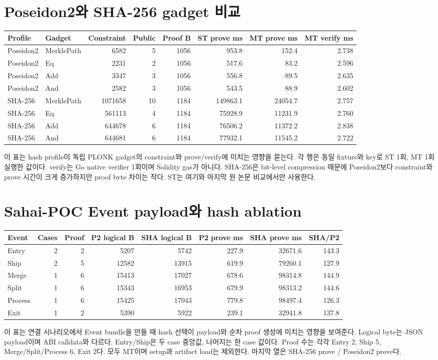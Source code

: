 \documentclass[10pt]{article}
\begin{document}
\section{Poseidon2와 SHA-256 gadget 비교}
\begin{longtable}{llrrrrrr}
\toprule Profile & Gadget & Constraint & Public & Proof B & ST prove ms & MT prove ms & MT verify ms\\
\midrule\endhead
Poseidon2 & MerklePath & 6582 & 5 & 1056 & 953.8 & 152.4 & 2.738\\
Poseidon2 & Eq & 2231 & 2 & 1056 & 517.6 & 83.2 & 2.596\\
Poseidon2 & Add & 3347 & 3 & 1056 & 556.8 & 89.5 & 2.635\\
Poseidon2 & And & 2582 & 3 & 1056 & 543.5 & 88.9 & 2.602\\
SHA-256 & MerklePath & 1071658 & 10 & 1184 & 149863.1 & 24054.7 & 2.757\\
SHA-256 & Eq & 561113 & 4 & 1184 & 75928.9 & 11231.9 & 2.760\\
SHA-256 & Add & 644678 & 6 & 1184 & 76506.2 & 11372.2 & 2.838\\
SHA-256 & And & 644681 & 6 & 1184 & 77932.1 & 11545.2 & 2.722\\
\bottomrule\end{longtable}
이 표는 hash profile이 독립 PLONK gadget의 constraint와 prove/verify에 미치는 영향을 묻는다. 각 행은 동일 fixture와 key로 ST 1회, MT 1회 실행한 값이다. verify는 Go native verifier 1회이며 Solidity gas가 아니다. SHA-256은 bit-level compression 때문에 Poseidon2보다 constraint와 prove 시간이 크게 증가하지만 proof byte 차이는 작다. ST는 여기와 마지막 원 논문 비교에서만 사용한다.
\section{Sahai-POC Event payload와 hash ablation}
\begin{longtable}{lrrrrrrr}
\toprule Event & Cases & Proof & P2 logical B & SHA logical B & P2 prove ms & SHA prove ms & SHA/P2\\
\midrule\endhead
Entry & 2 & 2 & 5207 & 5742 & 227.9 & 32671.6 & 143.3\\
Ship & 2 & 5 & 12582 & 13915 & 619.9 & 79260.1 & 127.9\\
Merge & 1 & 6 & 15413 & 17027 & 678.6 & 98314.8 & 144.9\\
Split & 1 & 6 & 15343 & 16953 & 679.9 & 98313.2 & 144.6\\
Process & 1 & 6 & 15425 & 17043 & 779.8 & 98497.4 & 126.3\\
Exit & 1 & 2 & 5390 & 5922 & 239.1 & 32941.8 & 137.8\\
\bottomrule\end{longtable}
이 표는 연결 시나리오에서 Event bundle을 만들 때 hash 선택이 payload와 순차 proof 생성에 미치는 영향을 보여준다. Logical byte는 JSON payload이며 ABI calldata와 다르다. Entry/Ship은 두 case 중앙값, 나머지는 한 case 값이다. Proof 수는 각각 Entry 2, Ship 5, Merge/Split/Process 6, Exit 2다. 모두 MT이며 setup과 artifact load는 제외한다. 마지막 열은 SHA-256 prove / Poseidon2 prove다.
\end{document}
